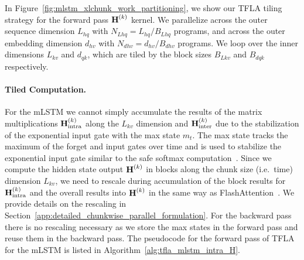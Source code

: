 \documentclass{article}
\begin{document}
In Figure~\ref{fig:mlstm_xlchunk_work_partitioning}, we show our TFLA tiling strategy for the forward pass $\bm{\mathrm{H}}^{(k)}$ kernel. 
We parallelize across the outer sequence dimension $L_{hq}$ with $N_{Lhq} = L_{hq} / B_{Lhq}$ programs, and across the outer embedding dimension $d_{hv}$ with $N_{dhv} = d_{hv} / B_{dhv}$ programs.
We loop over the inner dimensions $L_{kv}$ and $d_{qk}$, which are tiled by the block sizes $B_{Lkv}$ and $B_{dqk}$ respectively.

\paragraph{Tiled Computation.}
For the mLSTM we cannot simply accumulate the results of the matrix multiplications $\bm{\mathrm{H}}^{(k)}_\text{intra}$ along the $L_{kv}$ dimension and $\bm{\mathrm{H}}^{(k)}_\text{inter}$ due to the stabilization of the exponential input gate with the max state $m_t$.
The max state tracks the maximum of the forget and input gates over time and is used to stabilize the exponential input gate similar to the safe softmax computation~\citep{Milakov:18online}.
Since we compute the hidden state output $\bm{\mathrm{H}}^{(k)}$ in blocks along the chunk size (i.e.~time) dimension $L_{kv}$,
we need to rescale during accumulation of the block results for $\bm{\mathrm{H}}^{(k)}_\text{intra}$ and the overall results into $\bm{\mathrm{H}}^{(k)}$ in the same way as FlashAttention~\citep{dao:23flashattention2}.
We provide details on the rescaling in Section~\ref{app:detailed_chunkwise_parallel_formulation}.
For the backward pass there is no rescaling necessary as we store the max states in the forward pass and reuse them in the backward pass.
The pseudocode for the forward pass of TFLA for the mLSTM is listed in Algorithm~\ref{alg:tfla_mlstm_intra_H}.
\vspace{-0.2cm}
\end{document}

